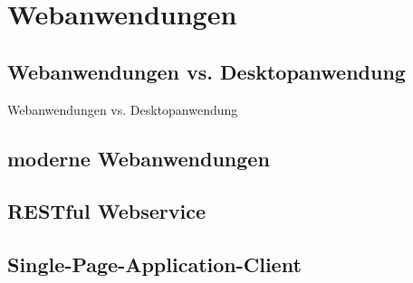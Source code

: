 \section{Webanwendungen}


\subsection{Webanwendungen vs. Desktopanwendung}

\begin{frame}{Webanwendungen vs. Desktopanwendung}
  \begin{center}
    
  \end{center}
\end{frame}

\subsection{moderne Webanwendungen}


\subsection{RESTful Webservice}


\subsection{Single-Page-Application-Client}


